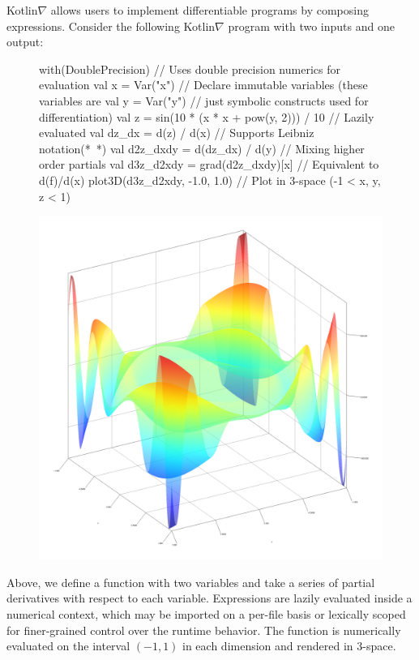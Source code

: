 \documentclass[12pt,initial,twoside,maitrise]{dms}
\numberwithin{equation}{section}
\numberwithin{table}{chapter}
\numberwithin{figure}{chapter}
\begin{document}
Kotlin$\nabla$ allows users to implement differentiable programs by composing expressions. Consider the following Kotlin$\nabla$ program with two inputs and one output:
%
\begin{figure}[H] \label{fig:basic_kotlingrad}
\begin{unbreakablekotlin}
with(DoublePrecision) { // Uses double precision numerics for evaluation
  val x = Var("x") // Declare immutable variables (these variables are
  val y = Var("y") // just symbolic constructs used for differentiation)
  val z = sin(10 * (x * x + pow(y, 2))) / 10 // Lazily evaluated
  val dz_dx = d(z) / d(x) // Supports Leibniz notation(*~\citep{christianson2012leibniz}*)
  val d2z_dxdy = d(dz_dx) / d(y) // Mixing higher order partials
  val d3z_d2xdy = grad(d2z_dxdy)[x] // Equivalent to d(f)/d(x)
  plot3D(d3z_d2xdy, -1.0, 1.0) // Plot in 3-space (-1 < x, y, z < 1)
}
\end{unbreakablekotlin}
\includegraphics[scale=0.43]{../figures/plot_result.png}
\end{figure}
%
Above, we define a function with two variables and take a series of partial derivatives with respect to each variable. Expressions are lazily evaluated inside a numerical context, which may be imported on a per-file basis or lexically scoped for finer-grained control over the runtime behavior. The function is numerically evaluated on the interval $(-1, 1)$ in each dimension and rendered in 3-space. %
\end{document}
